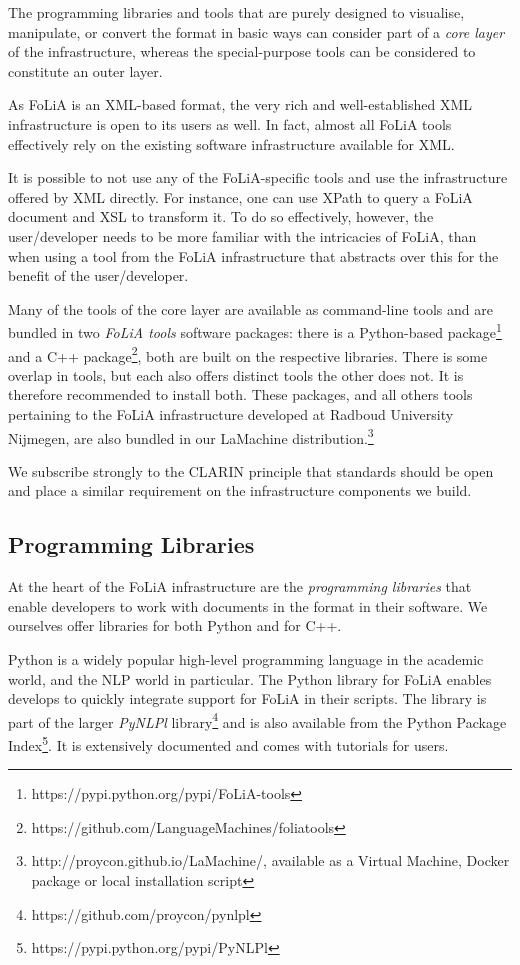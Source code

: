 \documentclass[a4paper,10pt,twoside]{article}
\begin{document}
The programming libraries and tools that are purely designed to visualise,
manipulate, or convert the format in basic ways can consider part of a
\emph{core layer} of the infrastructure, whereas the special-purpose tools can
be considered to constitute an outer layer.

As FoLiA is an XML-based format, the very rich and well-established XML
infrastructure is open to its users as well. In fact, almost all FoLiA tools
effectively rely on the existing software infrastructure available for XML. 

It is possible to not use any of the FoLiA-specific tools and use the
infrastructure offered by XML directly. For instance, one can use XPath to
query a FoLiA document and XSL to transform it. To do so effectively, however,
the user/developer needs to be more familiar with the intricacies of FoLiA,
than when using a tool from the FoLiA infrastructure that abstracts over this
for the benefit of the user/developer.

Many of the tools of the core layer are available as command-line tools and are
bundled in two \emph{FoLiA tools} software packages: there is a Python-based
package\footnote{https://pypi.python.org/pypi/FoLiA-tools} and a C++
package\footnote{https://github.com/LanguageMachines/foliatools}, both are
built on the respective libraries.  There is some overlap in tools, but each
also offers distinct tools the other does not. It is therefore recommended to
install both. These packages, and all others tools pertaining to the FoLiA
infrastructure developed at Radboud University Nijmegen, are also bundled in our
LaMachine distribution.\footnote{http://proycon.github.io/LaMachine/, available
as a Virtual Machine, Docker package or local installation script}

We subscribe strongly to the CLARIN principle that standards should be open and
place a similar requirement on the infrastructure components we build. 

\subsection{Programming Libraries}

At the heart of the FoLiA infrastructure are the \emph{programming libraries} that
enable developers to work with documents in the format in their software. We
ourselves offer libraries for both Python and for C++.

Python is a widely popular high-level programming language in the academic
world, and the NLP world in particular.  The Python library for FoLiA enables
develops to quickly integrate support for FoLiA in their scripts. The library
is part of the larger \emph{PyNLPl}
library\footnote{https://github.com/proycon/pynlpl} and is also available from the
Python Package Index\footnote{https://pypi.python.org/pypi/PyNLPl}. It is extensively documented and comes with tutorials for
users.
\end{document}
